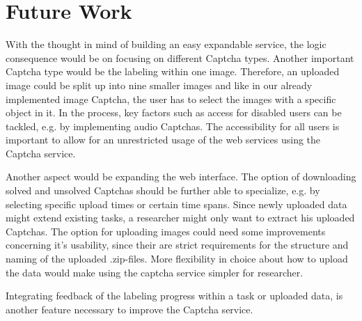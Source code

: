 \section{Future Work}
\label{sec:future_work}

With the thought in mind of building an easy expandable service, the logic consequence would be on focusing on different Captcha types. Another important Captcha type would be the labeling within one image. Therefore, an uploaded image could be split up into nine smaller images and like in our already implemented image Captcha, the user has to select the images with a specific object in it. In the process, key factors such as access for disabled users can be tackled, e.g. by implementing audio Captchas. The accessibility for all users is important to allow for an unrestricted usage of the web services using the Captcha service.

Another aspect would be expanding the web interface. The option of downloading solved and unsolved Captchas should be further able to specialize, e.g. by selecting specific upload times or certain time spans. Since newly uploaded data might extend existing tasks, a researcher might only want to extract his uploaded Captchas.
The option for uploading images could need some improvements concerning it's usability, since their are strict requirements for the structure and naming of the uploaded .zip-files. More flexibility in choice about how to upload the data would make using the captcha service simpler for researcher. 


Integrating feedback of the labeling progress within a task or uploaded data, is another feature necessary to improve the Captcha service.

\clearpage
